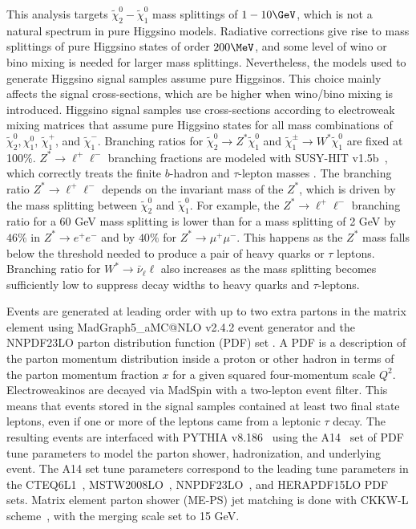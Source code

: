 This analysis targets $\tilde\chi_2^0-\tilde\chi_1^0$ mass splittings of $1-10\GeV$, which is not a natural spectrum in pure Higgsino models.  Radiative corrections give rise to mass splittings of pure Higgsino states of order $200\MeV$, and some level of wino or bino mixing is needed for larger mass splittings.  Nevertheless, the models used to generate Higgsino signal samples assume pure Higgsinos.  This choice mainly affects the signal cross-sections, which are be higher when wino/bino mixing is introduced.  Higgsino signal samples use cross-sections according to electroweak mixing matrices that assume pure Higgsino states for all mass combinations of $\tilde\chi_2^0, \chi_1^0$, $\tilde\chi_1^+$, and $\tilde\chi_1^-$.  Branching ratios for $\tilde\chi_2^0 \rightarrow Z^*\tilde\chi_1^0$ and $\tilde\chi_1^\pm \rightarrow W^* \tilde\chi_1^0$ are fixed at 100\%.  $Z^*\rightarrow \ell^+\ell^-$ branching fractions are modeled with SUSY-HIT v1.5b~\cite{spira}, which correctly treats the finite $b$-hadron and $\tau$-lepton masses \cite{spira}.  
The branching ratio $Z^* \rightarrow \ell^+\ell^-$ depends on the invariant mass of the $Z^*$, which is driven by the mass splitting between $\tilde\chi^0_2$ and $\tilde\chi^0_1$.  For example, the $Z^* \rightarrow \ell^+\ell^-$ branching ratio for a 60 GeV mass splitting is lower than for a mass splitting of 2 GeV by  $46\%$ in $Z^* \rightarrow e^+e^-$ and by $40\%$ for $Z^* \rightarrow \mu^+\mu^-$.  This happens as the $Z^*$ mass falls below the threshold needed to produce a pair of heavy quarks or $\tau$ leptons.  Branching ratio for $W^* \rightarrow \bar{\nu}_\ell \ell$ also increases as the mass splitting becomes sufficiently low to suppress decay widths to heavy quarks and $\tau$-leptons. %

Events are generated at leading order with up to two extra partons in the matrix element using MadGraph5\_aMC@NLO v2.4.2 event generator \cite{alwall} and the NNPDF23LO parton distribution function (PDF) set \cite{ball}.   A PDF is a description of the parton momentum distribution inside a proton or other hadron in terms of the parton momentum fraction $x$ for a given squared four-momentum scale $Q^2$.   Electroweakinos are decayed via MadSpin \cite{1126-6708-2007-04-081, Artoisenet2013} with a two-lepton event filter.  This means that events stored in the signal samples contained at least two final state leptons, even if one or more of the leptons came from a leptonic $\tau$ decay.  The resulting events are interfaced with PYTHIA v8.186~\cite{pythia} using the A14~\cite{a14} set of PDF tune parameters to model the parton shower, hadronization, and underlying event.  The A14 set tune parameters correspond to the leading tune parameters in the CTEQ6L1~\cite{Pumplin:2002vw}, MSTW2008LO~\cite{Watt:2012tq}, NNPDF23LO~\cite{ball}, and HERAPDF15LO PDF sets.  Matrix element parton shower (ME-PS) jet matching is done with CKKW-L scheme~\cite{ckkwl}, with the merging scale set to 15 GeV.  

